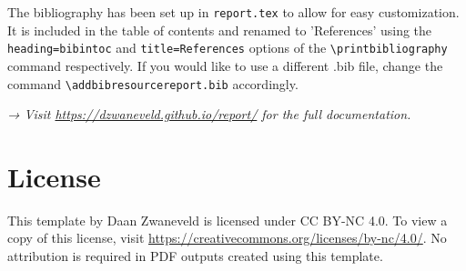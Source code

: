 The bibliography has been set up in \texttt{report.tex} to allow for easy customization. It is included in the table of contents and renamed to 'References' using the \texttt{heading=bibintoc} and \texttt{title=References} options of the \texttt{\textbackslash printbibliography} command respectively. If you would like to use a different .bib file, change the command \texttt{\textbackslash addbibresource{report.bib}} accordingly.

\emph{→ Visit \url{https://dzwaneveld.github.io/report/} for the full documentation.}

\section*{License}

This template by Daan Zwaneveld is licensed under CC BY-NC 4.0. To view a copy of this license, visit \url{https://creativecommons.org/licenses/by-nc/4.0/}. No attribution is required in PDF outputs created using this template.